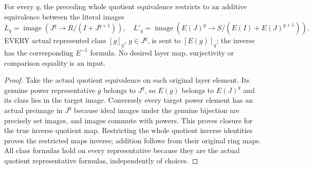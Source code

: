 \begin{lemma}
\label{hir:nonlinear-centre-actual-layer-comparison}
\leanok
For every $q$, the preceding whole quotient equivalence restricts to an
additive equivalence between the literal images
\[
 L_q=\operatorname{image}(J^q\to R/(I+J^{q+1})),\quad
 L'_q=\operatorname{image}(E(J)^q\to S/(E(I)+E(J)^{q+1})).
\]
EVERY actual represented class $[g]_q$, $g\in J^q$, is sent to
$[E(g)]_q$; the inverse has the corresponding $E^{-1}$ formula. No
desired layer map, surjectivity or comparison equality is an input.
\end{lemma}
\begin{proof}
Take the actual quotient equivalence on each original layer element.
Its genuine power representative $g$ belongs to $J^q$, so $E(g)$ belongs
to $E(J)^q$ and its class lies in the target image. Conversely every
target power element has an actual preimage in $J^q$ because ideal
images under the genuine bijection are precisely set images, and images
commute with powers. This proves closure for the true inverse quotient
map. Restricting the whole quotient inverse identities proves the
restricted maps inverse; addition follows from their original ring maps.
All class formulas hold on every representative because they are the
actual quotient representative formulas, independently of choices.
\end{proof}

